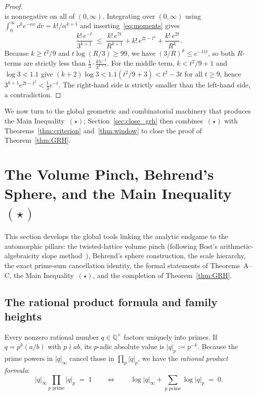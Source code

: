 \documentclass[11pt]{amsart}
\newcommand{\QQ}{\mathbb{Q}}
\theoremstyle{definition}
\theoremstyle{remark}
\begin{document}
\begin{proof}
\[\]
is nonnegative on all of $(0,\infty)$. Integrating over $(0,\infty)$ using $\int_0^\infty v^k e^{-\alpha v}\,dv=k!/\alpha^{k+1}$ and inserting~\eqref{eq:moments} gives
\[
 \frac{k!\,e^{-t}}{3^{k+1}} \;\le\; \frac{k!\,e^{7t}}{R^{k+1}} + k!\,e^{2t-t^2} + \frac{k!\,e^{2t}}{R^k}.
\]
Because $k\ge t^2/9$ and $t\log(R/3)\ge 99$, we have $(3/R)^k\le e^{-11t}$, so both $R$-terms are strictly less than $\frac13\cdot\frac{k!e^{-t}}{3^{k+1}}$. For the middle term, $k<t^2/9+1$ and $\log 3<1.1$ give $(k+2)\log 3<1.1(t^2/9+3)<t^2-3t$ for all $t\ge 9$, hence $3^{k+1}e^{2t-t^2}<\frac13 e^{-t}$. The right-hand side is strictly smaller than the left-hand side, a contradiction.
\end{proof}

We now turn to the global geometric and combinatorial machinery that produces the Main Inequality~$(\star)$; Section~\ref{sec:close_grh} then combines~$(\star)$ with Theorems~\ref{thm:criterion} and~\ref{thm:window} to close the proof of Theorem~\ref{thm:GRH}.

\section{The Volume Pinch, Behrend's Sphere, and the Main Inequality \texorpdfstring{$(\star)$}{(*)}}\label{sec:data}

This section develops the global tools linking the analytic endgame to the automorphic pillars: the twisted-lattice volume pinch (following Bost's arithmetic-algebraicity slope method~\cite{Bost}), Behrend's sphere construction, the scale hierarchy, the exact prime-sum cancellation identity, the formal statements of Theorems~A--C, the Main Inequality~$(\star)$, and the completion of Theorem~\ref{thm:GRH}.

\subsection{The rational product formula and family heights}
Every nonzero rational number $q\in\QQ^\times$ factors uniquely into primes. If $q=p^k(a/b)$ with $p\nmid ab$, its $p$-adic absolute value is $|q|_p:=p^{-k}$. Because the prime powers in $|q|_\infty$ cancel those in $\prod_p|q|_p$, we have the \emph{rational product formula}:
\[
 |q|_\infty\prod_{p\text{ prime}}|q|_p \;=\; 1
 \qquad\Longleftrightarrow\qquad
 \log|q|_\infty + \sum_{p\text{ prime}}\log|q|_p \;=\; 0.
\]
\end{document}
